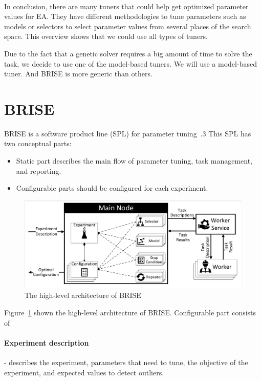 \paragraph{}
In conclusion, there are many tuners that could help get optimized parameter values for EA. They have different methodologies to tune parameters such as models or selectors to select parameter values from several places of the search space. This overview shows that we could use all types of tuners. 

Due to the fact that a genetic solver requires a big amount of time to solve the task, we decide to use one of the model-based tuners. We will use a model-based tuner. And BRISE is more generic than others. 

\section{BRISE}\label{sec:BRISE}

BRISE is a software product line (SPL) for parameter tuning~\cite{pukhkaiev19}.3
This SPL has two conceptual parts:

\begin{itemize}
	\item Static part describes the main flow of parameter tuning, task management, and reporting.
	\item Configurable parts should be configured for each experiment.
\end{itemize}

\begin{figure}
	\centering
	\includegraphics[width=\textwidth]{images/BRISEarch.pdf}
	\caption[The high-level architecture of BRISE]{The high-level architecture of BRISE}
	\label{fig:BRISEarch}
\end{figure}

Figure~\ref{fig:BRISEarch} shown the high-level architecture of BRISE.
Configurable part consists of 
\paragraph{Experiment description} - describes the experiment, parameters that need to tune, the objective of the experiment, and expected values to detect outliers.
